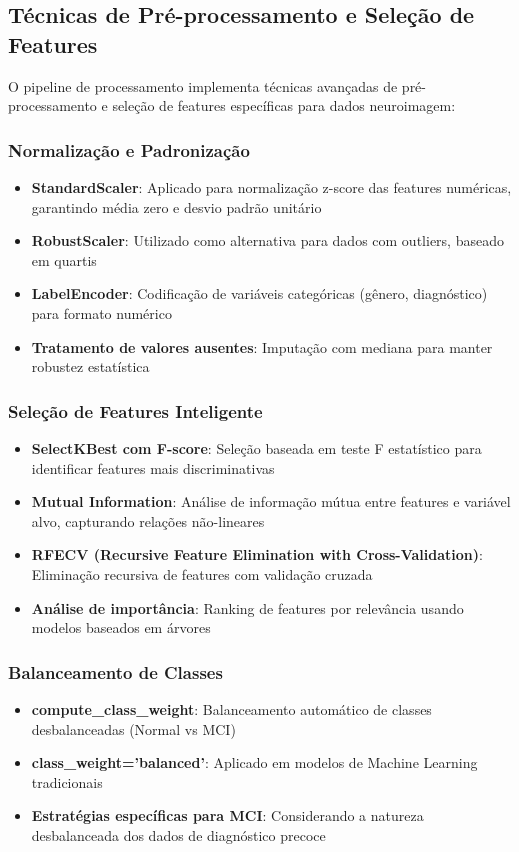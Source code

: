 
\subsection{Técnicas de Pré-processamento e Seleção de Features}

O pipeline de processamento implementa técnicas avançadas de pré-processamento e seleção de features específicas para dados neuroimagem:

\subsubsection{Normalização e Padronização}
\begin{itemize}
    \item \textbf{StandardScaler}: Aplicado para normalização z-score das features numéricas, garantindo média zero e desvio padrão unitário
    \item \textbf{RobustScaler}: Utilizado como alternativa para dados com outliers, baseado em quartis
    \item \textbf{LabelEncoder}: Codificação de variáveis categóricas (gênero, diagnóstico) para formato numérico
    \item \textbf{Tratamento de valores ausentes}: Imputação com mediana para manter robustez estatística
\end{itemize}

\subsubsection{Seleção de Features Inteligente}
\begin{itemize}
    \item \textbf{SelectKBest com F-score}: Seleção baseada em teste F estatístico para identificar features mais discriminativas
    \item \textbf{Mutual Information}: Análise de informação mútua entre features e variável alvo, capturando relações não-lineares
    \item \textbf{RFECV (Recursive Feature Elimination with Cross-Validation)}: Eliminação recursiva de features com validação cruzada
    \item \textbf{Análise de importância}: Ranking de features por relevância usando modelos baseados em árvores
\end{itemize}

\subsubsection{Balanceamento de Classes}
\begin{itemize}
    \item \textbf{compute\_class\_weight}: Balanceamento automático de classes desbalanceadas (Normal vs MCI)
    \item \textbf{class\_weight='balanced'}: Aplicado em modelos de Machine Learning tradicionais
    \item \textbf{Estratégias específicas para MCI}: Considerando a natureza desbalanceada dos dados de diagnóstico precoce
\end{itemize}

